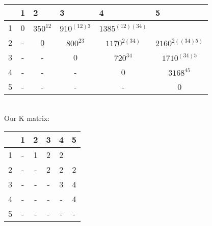 \documentclass[12pt]{article}
\begin{document}
\begin{table}[h]
\centering
\begin{tabular}{|c|c|c|c|c|c|}
\hline
\multicolumn{1}{|l|}{} & \multicolumn{1}{|l|}{1} & \multicolumn{1}{l|}{2} & \multicolumn{1}{l|}{3} & \multicolumn{1}{l|}{4} & \multicolumn{1}{l|}{5} \\ \hline
1&0                       & $350^{12}$                     &  $910^{ (12)3}$                    &                 $1385^{(12)(34)}$      &                   \\ \hline
2&-                       & 0                     & $800^{23} $                     &   $1170^{2(34)}$                    &         $2160^{2((34)5)}$         \\ \hline
3&-                       & -                     & 0                     & $ 720^{34} $                    &  $1710^{(34)5}$                     \\ \hline
4&-                       & -                     & -                     & 0                     & $ 3168^{45}$                     \\ \hline
5&-                       & -                     & -                     & -                     &    0                   \\ \hline
\end{tabular}
\end{table}
\\
Our K matrix:\\
\begin{table}[h]
\centering
\begin{tabular}{|c|c|c|c|c|c|}
\hline
\multicolumn{1}{|l|}{} & \multicolumn{1}{|l|}{1} & \multicolumn{1}{l|}{2} & \multicolumn{1}{l|}{3} & \multicolumn{1}{l|}{4} & \multicolumn{1}{l|}{5} \\ \hline
1&  -                   &     1                 &        2               &         2              &                   \\ \hline
2&-                       & -                     &      2                 &     2                  &       2            \\ \hline
3&-                       & -                     & -                     &     3                  &      4                 \\ \hline
4&-                       & -                     & -                     & -                     &   4                    \\ \hline
5&-                       & -                     & -                     & -                     &   -                   \\ \hline
\end{tabular}
\end{table}
\end{document}
